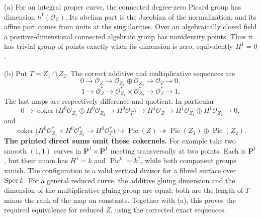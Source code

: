 \documentclass[11pt]{article}
\let\chapterexercise\exercise
\renewcommand{\exercise}[2]{\Needspace{8\baselineskip}\chapterexercise{#1}{#2}}
\begin{document}
\pf (a) For an integral proper curve, the connected degree-zero Picard group has dimension $h^1(\mathcal O_Z)$. Its abelian part is the Jacobian of the normalization, and its affine part comes from units at the singularities. Over an algebraically closed field a positive-dimensional connected algebraic group has nonidentity points. Thus it has trivial group of points exactly when its dimension is zero, equivalently $H^1=0$.

(b) Put $T=Z_1\cap Z_2$. The correct additive and multiplicative sequences are
\[ 0\to\mathcal O_Z\to\mathcal O_{Z_1}\oplus\mathcal O_{Z_2}
\to\mathcal O_T\to0, \]
\[ 1\to\mathcal O_Z^*\to\mathcal O_{Z_1}^*\times\mathcal O_{Z_2}^*
\to\mathcal O_T^*\to1. \]
The last maps are respectively difference and quotient. In particular
\[ 0\to\operatorname{coker}\bigl(H^0\mathcal O_{Z_1}\oplus H^0\mathcal O_{Z_2}
\to H^0\mathcal O_T\bigr)\to H^1\mathcal O_Z
\to H^1\mathcal O_{Z_1}\oplus H^1\mathcal O_{Z_2}\to0, \]
and
\[ \operatorname{coker}\bigl(H^0\mathcal O_{Z_1}^*\times H^0\mathcal O_{Z_2}^*
\to H^0\mathcal O_T^*\bigr)\hookrightarrow\operatorname{Pic}(Z)
\twoheadrightarrow\operatorname{Pic}(Z_1)\oplus\operatorname{Pic}(Z_2). \]
\textbf{The printed direct sums omit these cokernels.} For example take two smooth $(1,1)$ curves in $\mathbf P^1\times\mathbf P^1$ meeting transversally at two points. Each is $\mathbf P^1$, but their union has $H^1=k$ and $\operatorname{Pic}^0=k^*$, while both component groups vanish. The configuration is a valid vertical divisor for a fibred surface over $\operatorname{Spec} k$. For a general reduced curve, the additive gluing dimension and the dimension of the multiplicative gluing group are equal; both are the length of $T$ minus the rank of the map on constants. Together with (a), this proves the required equivalence for reduced $Z$, using the corrected exact sequences.
\end{document}
